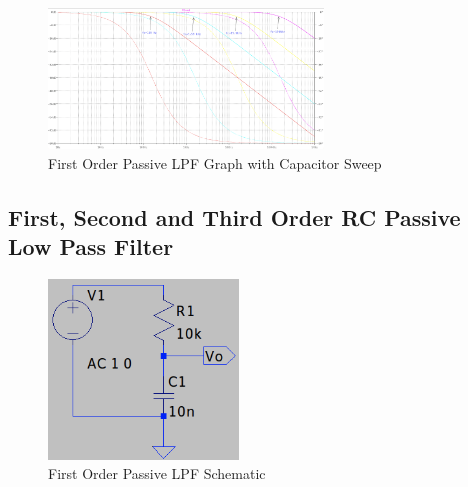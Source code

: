 \documentclass[CMPE]{KGCOEReport}
\begin{document}

\begin{figure}[H]
	\centering
  	\includegraphics[width=0.65\textwidth]{Screenshots/q3_graph}  
	\caption{First Order Passive LPF Graph with Capacitor Sweep}
	\label{q3_graph}
\end{figure}

\subsection*{First, Second and Third Order RC Passive Low Pass Filter}

\begin{figure}[H]
	\centering
  	\includegraphics[width=0.45\textwidth]{Screenshots/q4_first_order_schematic}  
	\caption{First Order Passive LPF Schematic}
	\label{q4_schematic_1}
\end{figure}
\end{document}
